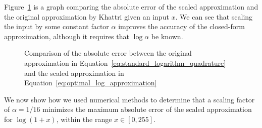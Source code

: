Figure~\ref{fig:log_error_comparison} is a graph comparing the absolute error of the scaled approximation and the original approximation by Khattri given an input $x$. We can see that scaling the input by some constant factor $\alpha$ improves the accuracy of the closed-form approximation, although it requires that $\log \alpha$ be known.

\begin{figure}[ht]
	\centering
	\caption{Comparison of the absolute error between the original approximation in Equation~\ref{eq:standard_logarithm_quadrature} and the scaled approximation in Equation~\ref{eq:optimal_log_approximation}}
	\label{fig:log_error_comparison}
\end{figure}

We now show how we used numerical methods to determine that a scaling factor of $\alpha = 1/16$ minimizes the maximum absolute error of the scaled approximation for $\log{\left(1+x\right)}$, within the range $x \in [0, 255]$.

